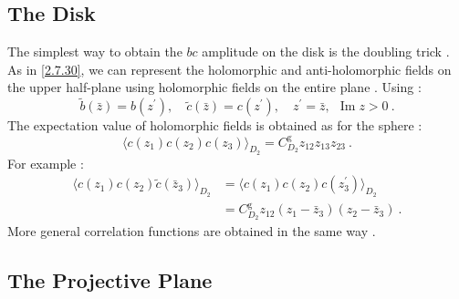 \subsection*{The Disk}
The simplest way to obtain the $bc$ amplitude on the disk is the doubling trick . As in \eqref{2.7.30}, we can represent the holomorphic and anti-holomorphic fields on the upper half-plane using holomorphic fields on the entire plane . Using :
\begin{equation}
	\tilde{b}(\bar{z})=b(z^{\prime}), \quad \tilde{c}(\bar{z})=c(z^{\prime}), \quad z^{\prime}=\bar{z},\:\: \operatorname{Im} z>0 \:. \label{6.3.9}
\end{equation}
The expectation value of holomorphic fields is obtained as for the sphere :
\begin{equation}
	\langle c(z_{1}) c(z_{2}) c(z_{3})\rangle_{D_{2}}=C_{D_{2}}^{\mathrm{g}} z_{12} z_{13} z_{23} \:. \label{6.3.10}
\end{equation}
For example :
\begin{align}
	\langle c(z_{1}) c(z_{2}) \tilde{c}(\bar{z}_{3})\rangle_{D_{2}} 
	&=\langle c(z_{1}) c(z_{2}) c(z_{3}^{\prime})\rangle_{D_{2}} \nonumber \\
	&=C_{D_{2}}^{\mathrm{g}} z_{12}(z_{1}-\bar{z}_{3})(z_{2}-\bar{z}_{3}) \:. \label{6.3.11}
\end{align}
More general correlation functions are obtained in the same way .

\subsection*{The Projective Plane}

